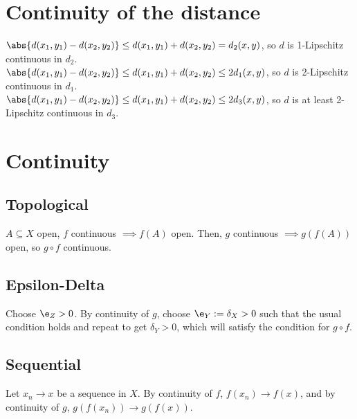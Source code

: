 \documentclass{article}
\begin{document}
\section{Continuity of the distance}
$\abs{d(x_1, y_1) - d(x_2, y_2)} \leq d(x_1, y_1) + d(x_2, y_2) = d_2(x, y)$, so $d$ is 1-Lipschitz continuous in $d_2$. \\
$\abs{d(x_1, y_1) - d(x_2, y_2)} \leq d(x_1, y_1) + d(x_2, y_2) \leq 2 d_1(x, y)$, so $d$ is 2-Lipschitz continuous in $d_1$. \\
$\abs{d(x_1, y_1) - d(x_2, y_2)} \leq d(x_1, y_1) + d(x_2, y_2) \leq 2 d_3(x, y)$, so $d$ is at least 2-Lipschitz continuous in $d_3$. \\

\newpage 

\section{Continuity}
\subsection*{Topological}
$A \subseteq X$ open, $f$ continuous $\implies f(A)$ open. 
Then, $g$ continuous $\implies g(f(A))$ open, so $g \circ f$ continuous.

\subsection*{Epsilon-Delta}
Choose $\e_Z > 0$. By continuity of $g$, choose $\e_Y := \delta_X > 0$ such that the usual condition holds and repeat to get $\delta_Y > 0$, which will satisfy the condition for $g \circ f$.

\subsection*{Sequential}
Let $x_n \to x$ be a sequence in $X$. By continuity of $f$, $f(x_n) \to f(x)$, and by continuity of $g$, $g(f(x_n)) \to g(f(x))$.
\end{document}
